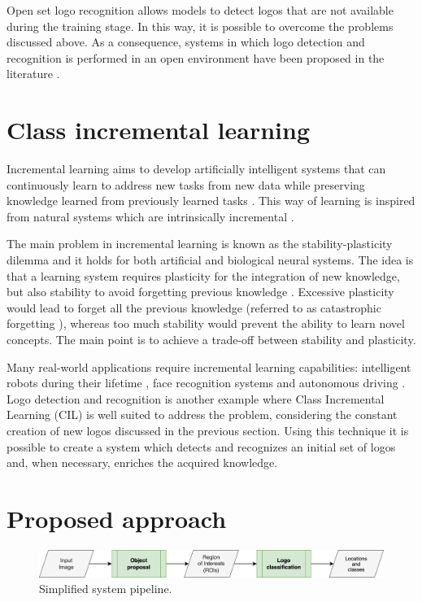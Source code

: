Open set logo recognition allows models to
detect logos that are not available during the training stage. In this way, it is possible to overcome the problems discussed above. As a consequence, systems in which logo detection and recognition is performed in an open environment have been proposed in the literature \cite{fehervari2019scalable, li2022seetek}.

\section{Class incremental learning}
Incremental learning aims to develop artificially intelligent
systems that can continuously learn to address new tasks
from new data while preserving knowledge learned from
previously learned tasks \cite{masana2020class}. This way of learning is inspired from natural systems which are intrinsically incremental \cite{wu2019large}.

The main problem in incremental learning is known as the stability-plasticity dilemma and it holds for both artificial and biological neural systems. The idea is that a learning system requires plasticity for the integration of new knowledge, but also stability to avoid forgetting previous knowledge \cite{mermillod2013stability}. Excessive plasticity would lead to forget all the previous knowledge (referred to as catastrophic forgetting \cite{grossberg2013adaptive}), whereas too much stability would prevent the ability to learn novel concepts. The main point is to achieve a trade-off between stability and plasticity. 

Many real-world applications require incremental learning capabilities: intelligent robots during their lifetime \cite{thrun1995lifelong}, face recognition systems \cite{li2017incremental} and autonomous driving \cite{pierre2018incremental}. Logo detection and recognition is another example where Class Incremental Learning (CIL) is well suited to address the problem, considering the constant creation of new logos discussed in the previous section. Using this technique it is possible to create a system which detects and recognizes an initial set of logos and, when necessary, enriches the acquired knowledge.

\section{Proposed approach}

\begin{figure}
    \begin{center}
        \includegraphics[width=\columnwidth]{images/pipeline.drawio.png}
    \end{center}
    \caption{Simplified system pipeline.}
    \label{fig:system-pipeline}
\end{figure}


